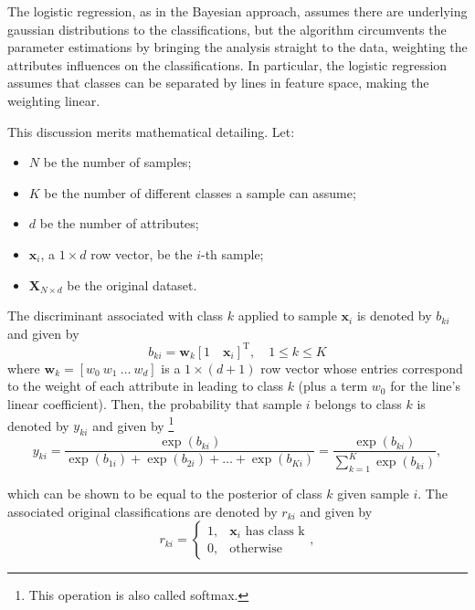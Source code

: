 The logistic regression, as in the Bayesian approach, 
assumes there are underlying gaussian distributions to the classifications,
but the algorithm circumvents the parameter estimations by
bringing the analysis straight to the data,
weighting the attributes influences on the classifications.
%
In particular, the logistic regression assumes that classes 
can be separated by lines in feature space, making the weighting linear.

This discussion merits mathematical detailing.
%
Let:
\begin{itemize} 
    \item $N$ be the number of samples;
    \item $K$ be the number of different classes a sample can assume;
    \item $d$ be the number of attributes;
    \item $\mathbf{x}_i$, a $1\times d$ row vector, be the $i$-th sample;
    \item $\mathbf{X}_{N\times d}$ be the original dataset.  
\end{itemize}
%
The discriminant associated with class $k$ applied to sample $\mathbf{x}_i$  
is denoted by $b_{ki}$ and given by 
%
\begin{equation}
    b_{ki} = \mathbf{w}_k[1\quad \mathbf{x}_i]^\text{T},
    \quad
    1\leq k\leq K
    \label{eq:b_ki}
\end{equation}
%
where $\mathbf{w}_k = [w_0\ w_1\ \dots\ w_d]$ is a $1\times (d+1)$ row vector 
whose entries correspond to the weight of each attribute in leading to class $k$
(plus a term $w_0$ for the line's linear coefficient).
%
Then, the probability that sample $i$ belongs to class $k$ is denoted by $y_{ki}$ and given by%
\footnote{
    This operation is also called softmax.
}%
%
\begin{equation}
    y_{ki} 
    = \frac{\exp(b_{ki})}
            {\exp(b_{1i}) + \exp(b_{2i}) + \dots + \exp(b_{Ki})}
    = \frac{\exp(b_{ki})}
           {\displaystyle\sum_{k=1}^K \exp(b_{ki})},
    \label{eq:y_ki}
\end{equation}

which can be shown to be equal to the posterior of class $k$ given sample $i$.
The associated original classifications are denoted by $r_{ki}$ and given by
%
\begin{equation}
    r_{ki} 
    = 
    \begin{cases} 
        1, &\mathbf{x}_i \text{ has class k} \\
        0, &\text{otherwise}
    \end{cases},
\end{equation}


